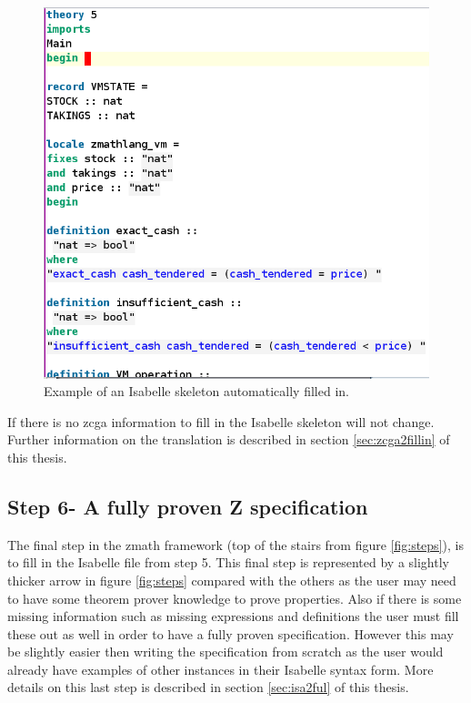 \begin{figure}[H]
 \begin{center}
 \includegraphics [scale=0.3]{Figures/Design/fillin1.png}
 \caption{Example of an Isabelle skeleton automatically filled in.}
 \label{fig:fillin1}
\end{center}
\end{figure} 

 If there is no \gls{zcga} information to fill in the Isabelle skeleton will not
 change. Further information on the translation is described in section
 \ref{sec:zcga2fillin} of this thesis.

\subsection{Step 6- A fully proven Z specification}

The final step in the \gls{zmath} framework (top of the stairs from figure
\ref{fig:steps}), is to fill in the Isabelle file from step 5. This final step
is represented by a slightly thicker arrow in figure \ref{fig:steps} compared
with the others as the user may need to have some theorem prover
knowledge to prove properties. Also if there is some missing information such as
missing expressions and definitions the user must fill these out as well in
order to have a fully proven specification. However this may be slightly easier
then writing the specification from scratch as the user would already have
examples of other instances in their Isabelle syntax form. More details on this
last step is described in section \ref{sec:isa2ful} of this thesis.

